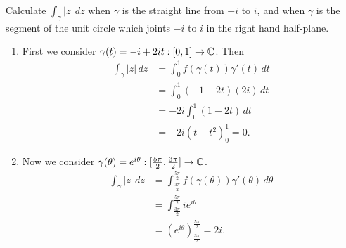\setcounter{question}{3}
\question Calculate $\int_\gamma \lvert z \rvert \,dz$ when
$\gamma$ is the straight line from $-i$ to $i$,
and when $\gamma$ is the segment of the unit circle which joints
$-i$ to $i$ in the right hand half-plane.
\begin{solution}
    \begin{enumerate}
        \item First we consider $\gamma(t) = -i + 2it: [0,1] \to \mathbb{C}$.
            Then
            \begin{align*}
                \int_\gamma \lvert z \rvert \,dz
                &= \int_0^1 f(\gamma(t)) \gamma'(t) \,dt \\
                &= \int_0^1 (-1 + 2t)(2i) \,dt \\
                &= -2i \int_0^1 (1 - 2t) \,dt \\
                &= -2i \left(t - t^2\right)_0^1 = 0.
            \end{align*}

        \item Now we consider 
            $\gamma(\theta) = e^{i\theta}: [\frac{5\pi}2, \frac{3\pi}2] \to \mathbb{C}$.
            \begin{align*}
                \int_\gamma \lvert z \rvert \,dz
                &= \int^{\frac{5\pi}2}_{\frac{3\pi}2} 
                    f(\gamma(\theta)) \gamma'(\theta) \, d\theta \\
                &= \int^{\frac{5\pi}2}_{\frac{3\pi}2} ie^{i\theta} \\
                &= \left(e^{i\theta}\right)^{\frac{5\pi}2}_{\frac{3\pi}2} = 2i.
            \end{align*}
    \end{enumerate}
\end{solution}

